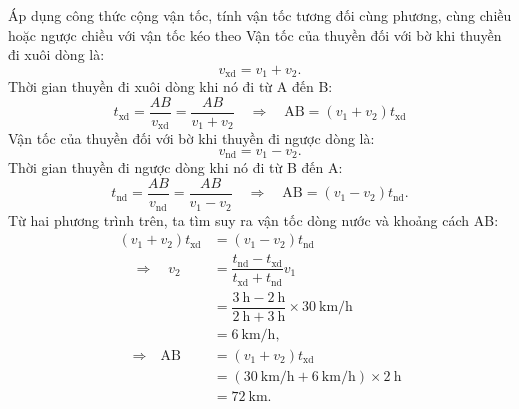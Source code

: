 \begin{dang}{Áp dụng công thức cộng vận tốc, tính vận tốc tương đối cùng phương, cùng chiều hoặc ngược chiều với vận tốc kéo theo}
{		Vận tốc của thuyền đối với bờ khi thuyền đi xuôi dòng là:
		$$v_{\text{xd}}=v_1+v_2.$$
		Thời gian thuyền đi xuôi dòng khi nó đi từ A đến B:
		\begin{equation*}
			t_{\text{xd}}=\dfrac{AB}{v_{\text{xd}}}= \dfrac{AB}{v_1+v_2}\quad \Rightarrow\quad \text{AB}=(v_1+v_2)t_{\text{xd}}
		\end{equation*}
		Vận tốc của thuyền đối với bờ khi thuyền đi ngược dòng là:
		$$v_{\text{nd}}=v_1-v_2.$$
		Thời gian thuyền đi ngược dòng khi nó đi từ B đến A:
		\begin{equation*}
			t_{\text{nd}}=\dfrac{AB}{v_{\text{nd}}}= \dfrac{AB}{v_1-v_2}\quad\Rightarrow\quad \text{AB}=(v_1-v_2)t_\text{nd}.
		\end{equation*}
		Từ hai phương trình trên, ta tìm suy ra vận tốc dòng nước và khoảng cách AB:
		\begin{align*}
			(v_1+v_2)t_{\text{xd}}&=(v_1-v_2)t_{\text{nd}}\\
			\quad\Rightarrow\quad	v_2&=\dfrac{t_\text{nd}-t_\text{xd}}{t_{\text{xd}}+t_\text{nd}}v_1\\
			&=\dfrac{\SI{3}{\hour}-\SI{2}{\hour}}{\SI{2}{\hour}+\SI{3}{\hour}}\times\SI{30}{\kilo\meter/\hour}\\
			&=\SI{6}{\kilo\meter/\hour},\\
			\quad\Rightarrow\quad \text{AB}&=(v_1+v_2)t_\text{xd}\\
			&=(\SI{30}{\kilo\meter/\hour}+\SI{6}{\kilo\meter/\hour})\times\SI{2}{\hour}\\
			&=\SI{72}{\kilo\meter}.
		\end{align*}
	}
\end{dang}